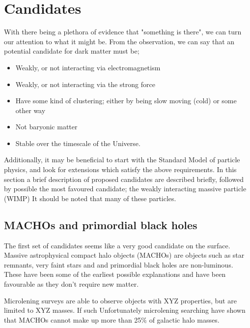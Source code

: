 \section{Candidates}
\par
With there being a plethora of evidence that "something is there", we can turn our attention to what it might be.
From the observation, we can say that an potential candidate for dark matter must be;
\begin{itemize}
    \item Weakly, or not interacting via electromagnetism 
    \item Weakly, or not interacting via the strong force
    \item Have some kind of clustering; either by being slow moving (cold) or some other way
    \item Not baryonic matter
    \item Stable over the timescale of the Universe.
\end{itemize}
Additionally, it may be beneficial to start with the Standard Model of particle physics, and look for extensions which satisfy the above requirements.
In this section a brief description of proposed candidates are described briefly, followed by possible the most favoured candidate; the weakly interacting massive particle (WIMP)
It should be noted that many of these particles.

\subsection{MACHOs and primordial black holes}
\par
The first set of candidates seems like a very good candidate on the surface.
Massive astrophysical compact halo objects (MACHOs) are objects such as star remnants, very faint stars and 
and primordial black holes are non-luminous.
These have been some of the earliest possible explanations and have been favourable as they don't require new matter.

\par
Microlening surveys are able to observe objects with XYZ properties, but are limited to XYZ masses.
If such 
Unfortunately microlening searching have shown that MACHOs cannot make up more than 25\% of galactic halo masses.

